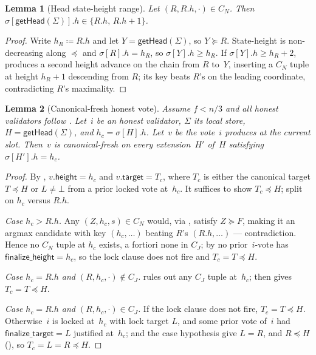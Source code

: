 \documentclass{article}
\newcommand{\target}{\mathsf{target}}
\newcommand{\height}{\mathsf{height}}
\newcommand{\finalizeHeight}{\mathsf{finalize\_height}}
\newcommand{\finalizeTarget}{\mathsf{finalize\_target}}
\newcommand{\getHead}{\textsf{getHead}\xspace}
\theoremstyle{plain}
\newtheorem{lemma}{Lemma}
\theoremstyle{definition}
\theoremstyle{remark}
\begin{document}
\begin{lemma}[Head state-height range]\label{rev:lem:head-height-range}
Let $(R, R.h, \cdot) \in C_N$. Then $\sigma[\getHead(\Sigma)].h \in \{R.h,\, R.h + 1\}$.
\end{lemma}

\begin{proof}
Write $h_R \coloneqq R.h$ and let $Y = \getHead(\Sigma)$, so $Y \succeq R$.
State-height is non-decreasing along $\preceq$ and $\sigma[R].h = h_R$, so $\sigma[Y].h \geq h_R$.
If $\sigma[Y].h \geq h_R + 2$,  produces a second height advance on the chain from $R$ to~$Y$, inserting a $C_N$ tuple at height $h_R + 1$ descending from $R$; its key beats $R$'s on the leading coordinate, contradicting $R$'s maximality.
\end{proof}

\begin{lemma}[Canonical-fresh honest vote]\label{rev:lem:canonical-fresh-honest-vote}
Assume $f < n/3$ and all honest validators follow .
Let~$i$ be an honest validator, $\Sigma$ its local store, $H = \getHead(\Sigma)$, and $h_c = \sigma[H].h$.
Let~$v$ be the vote~$i$ produces at the current slot.
Then~$v$ is canonical-fresh on every extension~$H'$ of~$H$ satisfying $\sigma[H'].h = h_c$.
\end{lemma}

\begin{proof}
By , $v.\height = h_c$ and $v.\target = T_c$, where $T_c$ is either the canonical target $T \preceq H$ or $L \neq \bot$ from a prior locked vote at~$h_c$.
It suffices to show $T_c \preceq H$; split on $h_c$ versus $R.h$.

\emph{Case $h_c > R.h$.}
Any $(Z, h_c, s) \in C_N$ would, via , satisfy $Z \succeq F$, making it an argmax candidate with key $(h_c, \ldots)$ beating $R$'s $(R.h, \ldots)$ --- contradiction.
Hence no $C_N$ tuple at $h_c$ exists, a fortiori none in $C_J$; by  no prior~$i$-vote has $\finalizeHeight = h_c$, so the lock clause does not fire and $T_c = T \preceq H$.

\emph{Case $h_c = R.h$ and $(R, h_c, \cdot) \notin C_J$.}
 rules out any $C_J$ tuple at~$h_c$;  then gives $T_c = T \preceq H$.

\emph{Case $h_c = R.h$ and $(R, h_c, \cdot) \in C_J$.}
If the lock clause does not fire, $T_c = T \preceq H$.
Otherwise~$i$ is locked at~$h_c$ with lock target $L$, and some prior vote of~$i$ had $\finalizeTarget = L$ justified at~$h_c$;  and the case hypothesis give $L = R$, and $R \preceq H$ (), so $T_c = L = R \preceq H$.
\end{proof}
\end{document}
